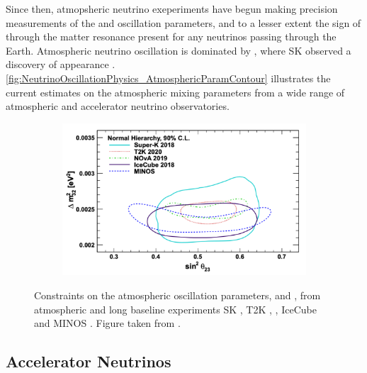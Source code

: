 Since then, atmopsheric neutrino exeperiments have begun making precision measurements of the \sinsqatm and  oscillation parameters, and to a lesser extent the sign of \delmsqatm through the matter resonance present for any neutrinos passing through the Earth. Atmospheric neutrino oscillation is dominated by , where SK observed a \quickmath{4.6\sigma} discovery of \quickmath{\nu_{\tau}} appearance \cite{Li_2018}. \autoref{fig:NeutrinoOscillationPhysics_AtmosphericParamContour} illustrates the current estimates on the atmospheric mixing parameters from a wide range of atmospheric and accelerator neutrino observatories.

\begin{figure}[h]
  \begin{subfigure}[t]{0.90\textwidth}
    \includegraphics[width=\textwidth, trim={0mm 0mm 0mm 0mm}, clip,page=1]{Figures/Theory/AtmosphericParams.pdf}
  \end{subfigure}
  \caption{Constraints on the atmospheric oscillation parameters, \sinsqatm and \delmsqatm, from atmospheric and long baseline experiments SK \cite{Kamiokande_Collaboration2017-nf}, T2K \cite{T2K_Collaboration2018-sm},  \cite{Acero2019-rw}, IceCube \cite{Aartsen2018-cz} and MINOS \cite{Adamson2014-tt}. Figure taken from \cite{Athar_2022}.}
  \label{fig:NeutrinoOscillationPhysics_AtmosphericParamContour}
\end{figure}

\subsection{Accelerator Neutrinos}
\label{subsec:NeutrinoOscillationPhysics_AcceleratorNeutrinos}

